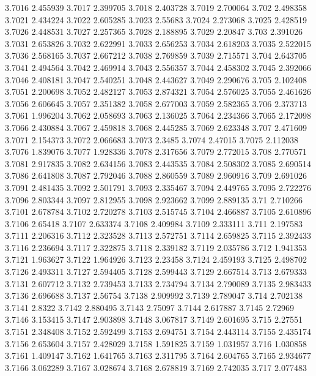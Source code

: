 3.7016  2.455939
3.7017  2.399705
3.7018  2.403728
3.7019  2.700064
3.702  2.498358
3.7021  2.434224
3.7022  2.605285
3.7023  2.55683
3.7024  2.273068
3.7025  2.428519
3.7026  2.448531
3.7027  2.257365
3.7028  2.188895
3.7029  2.20847
3.703  2.391026
3.7031  2.653826
3.7032  2.622991
3.7033  2.656253
3.7034  2.618203
3.7035  2.522015
3.7036  2.568165
3.7037  2.667212
3.7038  2.769859
3.7039  2.715571
3.704  2.643705
3.7041  2.494564
3.7042  2.469914
3.7043  2.556357
3.7044  2.458302
3.7045  2.392066
3.7046  2.408181
3.7047  2.540251
3.7048  2.443627
3.7049  2.290676
3.705  2.102408
3.7051  2.200698
3.7052  2.482127
3.7053  2.874321
3.7054  2.576025
3.7055  2.461626
3.7056  2.606645
3.7057  2.351382
3.7058  2.677003
3.7059  2.582365
3.706  2.373713
3.7061  1.996204
3.7062  2.058693
3.7063  2.136025
3.7064  2.234366
3.7065  2.172098
3.7066  2.430884
3.7067  2.459818
3.7068  2.445285
3.7069  2.623348
3.707  2.471609
3.7071  2.154373
3.7072  2.066683
3.7073  2.3485
3.7074  2.47015
3.7075  2.112038
3.7076  1.839076
3.7077  1.928336
3.7078  2.317656
3.7079  2.772015
3.708  2.770571
3.7081  2.917835
3.7082  2.634156
3.7083  2.443535
3.7084  2.508302
3.7085  2.690514
3.7086  2.641808
3.7087  2.792046
3.7088  2.860559
3.7089  2.960916
3.709  2.691026
3.7091  2.481435
3.7092  2.501791
3.7093  2.335467
3.7094  2.449765
3.7095  2.722276
3.7096  2.803344
3.7097  2.812955
3.7098  2.923662
3.7099  2.889135
3.71  2.710266
3.7101  2.678784
3.7102  2.720278
3.7103  2.515745
3.7104  2.466887
3.7105  2.610896
3.7106  2.65418
3.7107  2.633374
3.7108  2.409984
3.7109  2.333111
3.711  2.197583
3.7111  2.206316
3.7112  2.323528
3.7113  2.572751
3.7114  2.659825
3.7115  2.392433
3.7116  2.236694
3.7117  2.322875
3.7118  2.339182
3.7119  2.035786
3.712  1.941353
3.7121  1.963627
3.7122  1.964926
3.7123  2.23458
3.7124  2.459193
3.7125  2.498702
3.7126  2.493311
3.7127  2.594405
3.7128  2.599443
3.7129  2.667514
3.713  2.679333
3.7131  2.607712
3.7132  2.739453
3.7133  2.734794
3.7134  2.790089
3.7135  2.983433
3.7136  2.696688
3.7137  2.56754
3.7138  2.909992
3.7139  2.789047
3.714  2.702138
3.7141  2.8322
3.7142  2.880495
3.7143  2.75097
3.7144  2.617887
3.7145  2.72969
3.7146  3.153415
3.7147  2.903898
3.7148  3.067817
3.7149  2.601695
3.715  2.27551
3.7151  2.348408
3.7152  2.592499
3.7153  2.694751
3.7154  2.443114
3.7155  2.435174
3.7156  2.653604
3.7157  2.428029
3.7158  1.591825
3.7159  1.031957
3.716  1.030858
3.7161  1.409147
3.7162  1.641765
3.7163  2.311795
3.7164  2.604765
3.7165  2.934677
3.7166  3.062289
3.7167  3.028674
3.7168  2.678819
3.7169  2.742035
3.717  2.077483
